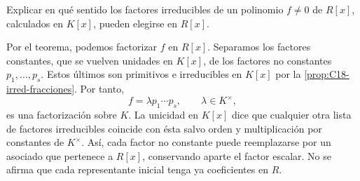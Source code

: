 \begin{ejer}\label{ejer:C18-elegir-factores}
Explicar en qué sentido los factores irreducibles de un polinomio $f\ne0$ de $R[x]$, calculados en $K[x]$, pueden elegirse en $R[x]$.
\end{ejer}
\begin{sol}
Por el teorema, podemos factorizar $f$ en $R[x]$. Separamos los factores constantes, que se vuelven unidades en $K[x]$, de los factores no constantes $p_1,\ldots,p_s$. Estos últimos son primitivos e irreducibles en $K[x]$ por la \cref{prop:C18-irred-fracciones}. Por tanto,
\[
f=\lambda p_1\cdots p_s,\qquad \lambda\in K^\times,
\]
es una factorización sobre $K$. La unicidad en $K[x]$ dice que cualquier otra lista de factores irreducibles coincide con ésta salvo orden y multiplicación por constantes de $K^\times$. Así, cada factor no constante puede reemplazarse por un asociado que pertenece a $R[x]$, conservando aparte el factor escalar. No se afirma que cada representante inicial tenga ya coeficientes en $R$.
\end{sol}
